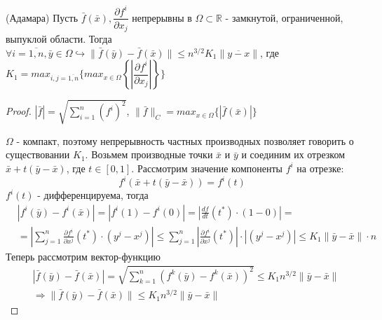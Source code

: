 \begin{lemma} (Адамара)
	Пусть $\bar{f}(\bar{x}), \dfrac{\partial f^i}{\partial x_j}$ непрерывны в $\Omega \subset \mathbb{R} $ - замкнутой, ограниченной, выпуклой области. Тогда $\forall i = \overline{1,n}, \bar{y} \in \Omega \hookrightarrow \| \bar{f}(\bar{y}) - \bar{f}(\bar{x}) \| \le n^{3/2}K_1\|\overline{y-x}\|$, где $K_1 = max_{i,j=\overline{1,n}}\{max_{x\in\Omega}\left\{\left|\dfrac{\partial f^i}{\partial x_j}\right|\right\} \}$
\end{lemma}

\begin{proof}
	
	$|\bar{f}| = \sqrt{\sum\limits_{i=1}^n (f^i)^2}$, $\|\bar{f}\|_C = max_{x\in\Omega}\{|\bar{f}(\bar{x})|\}$
	
	$\Omega$ - компакт, поэтому непрерывность частных производных позволяет говорить о существовании $K_1$. Возьмем производные точки $\bar{x}$ и $\bar{y}$ и соединим их отрезком $\bar{x} + t(\bar{y} - \bar{x})$, где $t\in[0, 1]$. Рассмотрим значение компоненты $f^i$ на отрезке:
	\[
		f^i(\bar{x} + t(\bar{y} - \bar{x})) = f^i(t)
	\]
	$f^i(t)$ - дифференцируема, тогда
	\begin{align*}
		&|f^i(\bar{y}) - f^i(\bar{x})| = |f^i(1) - f^i(0)| = \left| \frac{df}{dt}(t^*)\cdot(1-0)\right| = \\
		&= \left|\sum\limits_{j=1}^n\frac{\partial f^i}{\partial x^j}(t^*)\cdot(y^j - x^j)\right| \le \sum\limits_{j=1}^n\left|\frac{\partial f^i}{\partial x^j}(t^*)\right|\cdot\left|(y^j - x^j)\right| \le K_1\|\bar{y}-\bar{x}\|\cdot n
	\end{align*}
	Теперь рассмотрим вектор-функцию
	\begin{align*}
		&|\bar{f}(\bar{y}) - \bar{f}(\bar{x})| = \sqrt{\sum\limits_{k=1}^n (f^k(\bar{y}) - f^k(\bar{x}))^2} \le K_1n^{3/2}\|\bar{y}-\bar{x}\| \\
		&\Rightarrow \|\bar{f}(\bar{y}) - \bar{f}(\bar{x})\| \le K_1n^{3/2}\|\bar{y}-\bar{x}\|
	\end{align*}
\end{proof}


